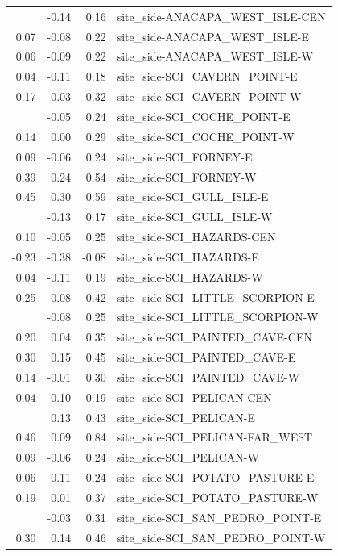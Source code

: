 \documentclass[]{article}
\begin{document}
\begin{longtable}[t]{rrrl}
\addlinespace
0.01 & -0.14 & 0.16 & site\_side-ANACAPA\_WEST\_ISLE-CEN\\
0.07 & -0.08 & 0.22 & site\_side-ANACAPA\_WEST\_ISLE-E\\
0.06 & -0.09 & 0.22 & site\_side-ANACAPA\_WEST\_ISLE-W\\
0.04 & -0.11 & 0.18 & site\_side-SCI\_CAVERN\_POINT-E\\
0.17 & 0.03 & 0.32 & site\_side-SCI\_CAVERN\_POINT-W\\
\addlinespace
0.10 & -0.05 & 0.24 & site\_side-SCI\_COCHE\_POINT-E\\
0.14 & 0.00 & 0.29 & site\_side-SCI\_COCHE\_POINT-W\\
0.09 & -0.06 & 0.24 & site\_side-SCI\_FORNEY-E\\
0.39 & 0.24 & 0.54 & site\_side-SCI\_FORNEY-W\\
0.45 & 0.30 & 0.59 & site\_side-SCI\_GULL\_ISLE-E\\
\addlinespace
0.02 & -0.13 & 0.17 & site\_side-SCI\_GULL\_ISLE-W\\
0.10 & -0.05 & 0.25 & site\_side-SCI\_HAZARDS-CEN\\
-0.23 & -0.38 & -0.08 & site\_side-SCI\_HAZARDS-E\\
0.04 & -0.11 & 0.19 & site\_side-SCI\_HAZARDS-W\\
0.25 & 0.08 & 0.42 & site\_side-SCI\_LITTLE\_SCORPION-E\\
\addlinespace
0.08 & -0.08 & 0.25 & site\_side-SCI\_LITTLE\_SCORPION-W\\
0.20 & 0.04 & 0.35 & site\_side-SCI\_PAINTED\_CAVE-CEN\\
0.30 & 0.15 & 0.45 & site\_side-SCI\_PAINTED\_CAVE-E\\
0.14 & -0.01 & 0.30 & site\_side-SCI\_PAINTED\_CAVE-W\\
0.04 & -0.10 & 0.19 & site\_side-SCI\_PELICAN-CEN\\
\addlinespace
0.28 & 0.13 & 0.43 & site\_side-SCI\_PELICAN-E\\
0.46 & 0.09 & 0.84 & site\_side-SCI\_PELICAN-FAR\_WEST\\
0.09 & -0.06 & 0.24 & site\_side-SCI\_PELICAN-W\\
0.06 & -0.11 & 0.24 & site\_side-SCI\_POTATO\_PASTURE-E\\
0.19 & 0.01 & 0.37 & site\_side-SCI\_POTATO\_PASTURE-W\\
\addlinespace
0.14 & -0.03 & 0.31 & site\_side-SCI\_SAN\_PEDRO\_POINT-E\\
0.30 & 0.14 & 0.46 & site\_side-SCI\_SAN\_PEDRO\_POINT-W\\

\end{longtable}
\end{document}
